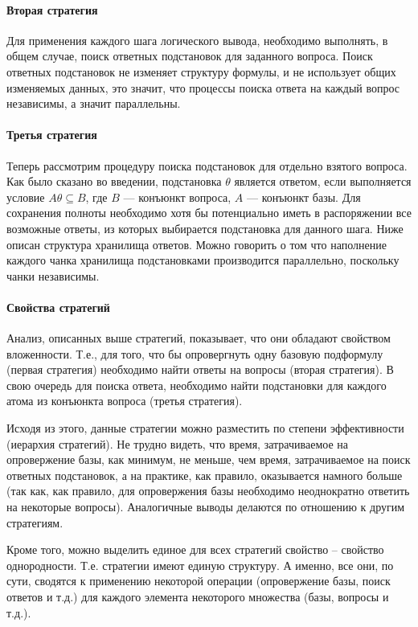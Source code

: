 \paragraph{Вторая стратегия}
Для применения каждого шага логического вывода, необходимо выполнять, в общем случае, поиск ответных подстановок для заданного вопроса. Поиск ответных подстановок не изменяет структуру формулы, и не использует общих изменяемых данных, это значит, что процессы поиска ответа на каждый вопрос независимы, а значит параллельны. 


\paragraph{Третья стратегия}
Теперь рассмотрим процедуру поиска подстановок для отдельно взятого вопроса. 
Как было сказано во введении, подстановка $\theta$ является ответом, если выполняется 
условие $A\theta \subseteq B$, где $B$ --- конъюнкт вопроса, $A$ --- конъюнкт базы. 
Для сохранения полноты необходимо хотя бы потенциально иметь в распоряжении все возможные ответы, 
из которых выбирается подстановка для данного шага. Ниже описан структура хранилища ответов. Можно говорить о том что наполнение каждого чанка хранилища подстановками производится параллельно, поскольку чанки независимы.

\paragraph{Свойства стратегий}

Анализ, описанных выше стратегий, показывает, что они обладают свойством вложенности. Т.е., для того, что бы опровергнуть одну базовую подформулу (первая стратегия) необходимо найти ответы на вопросы (вторая стратегия). В свою очередь для поиска ответа, необходимо найти подстановки для каждого атома из конъюнкта вопроса (третья стратегия).

Исходя из этого, данные стратегии можно разместить по степени эффективности (иерархия стратегий). Не трудно видеть, что время, затрачиваемое на опровержение базы, как минимум, не меньше, чем время, затрачиваемое на поиск ответных подстановок, а на практике, как правило, оказывается намного больше (так как, как правило, для опровержения базы необходимо неоднократно ответить на некоторые вопросы). Аналогичные выводы делаются по отношению к другим стратегиям. 

Кроме того, можно выделить единое для всех стратегий свойство – свойство однородности. Т.е. стратегии имеют единую структуру. А именно, все они, по сути, сводятся к применению некоторой операции (опровержение базы, поиск ответов и т.д.) для каждого элемента некоторого множества (базы, вопросы и т.д.). 

